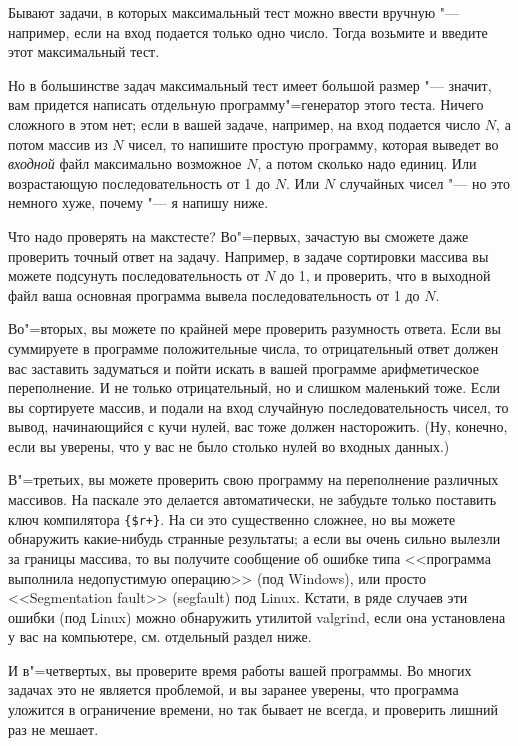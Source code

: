 \documentclass[a4paper,10pt]{problems}
\begin{document}
Бывают задачи, в которых максимальный тест можно ввести вручную "--- например, если на вход подается только одно число.
Тогда возьмите и введите этот максимальный тест.

Но в большинстве задач максимальный тест имеет большой размер "--- значит, вам придется написать отдельную программу"=генератор этого теста. 
Ничего сложного в этом нет; если в вашей задаче, например, на вход подается число $N$, а потом массив из $N$ чисел, то напишите простую программу,
которая выведет во \textit{входной} файл максимально возможное $N$, а потом сколько надо единиц. 
Или возрастающую последовательность от 1 до $N$. 
Или $N$ случайных чисел "--- но это немного хуже, почему "--- я напишу ниже.

Что надо проверять на макстесте? 
Во"=первых, зачастую вы сможете даже проверить точный ответ на задачу. 
Например, в задаче сортировки массива вы можете подсунуть последовательность от $N$ до 1, и проверить, что в выходной файл ваша основная программа
вывела последовательность от 1 до $N$.

Во"=вторых, вы можете по крайней мере проверить разумность ответа. 
Если вы суммируете в программе положительные числа, то отрицательный ответ должен вас заставить задуматься и пойти искать в вашей программе арифметическое переполнение. И не только отрицательный, но и слишком маленький тоже. Если вы сортируете массив, и подали на вход случайную последовательность чисел, то вывод, начинающийся с кучи нулей, вас тоже должен насторожить. (Ну, конечно, если вы уверены, что у вас не было столько нулей во входных данных.)

В"=третьих, вы можете проверить свою программу на переполнение различных массивов. 
На паскале это делается автоматически, не забудьте только поставить ключ компилятора \verb`{$r+}`.
На си это существенно сложнее, но вы можете обнаружить какие-нибудь странные результаты;
а если вы очень сильно вылезли за границы массива, то вы получите сообщение об ошибке типа <<программа выполнила недопустимую операцию>> (под Windows),
или просто <<Segmentation fault>> (segfault) под Linux. 
Кстати, в ряде случаев эти ошибки (под Linux) можно обнаружить утилитой valgrind, если она установлена у вас на компьютере, см. отдельный раздел ниже.

И в"=четвертых, вы проверите время работы вашей программы. 
Во многих задачах это не является проблемой, и вы заранее уверены, что программа уложится в ограничение времени, 
но так бывает не всегда, и проверить лишний раз не мешает.
\end{document}
